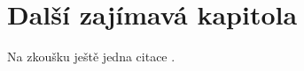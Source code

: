 \chapter{Další zajímavá kapitola}
\label{chap:dalsi-zajimava-kapitola}

\lipsum[67-80]

Na zkoušku ještě jedna citace \cite{latex2e}.
